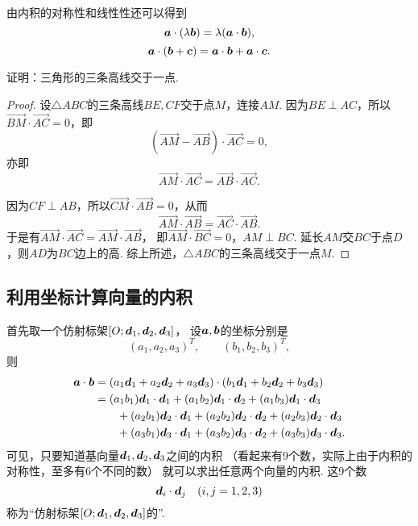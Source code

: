由内积的对称性和线性性还可以得到\[
	\boldsymbol{a}\cdot(\lambda\boldsymbol{b})=\lambda(\boldsymbol{a}\cdot\boldsymbol{b}),
\]\[
	\boldsymbol{a}\cdot(\boldsymbol{b}+\boldsymbol{c})=\boldsymbol{a}\cdot\boldsymbol{b}+\boldsymbol{a}\cdot\boldsymbol{c}.
\]

\begin{example}
证明：三角形的三条高线交于一点.
\begin{proof}
设\(\triangle ABC\)的三条高线\(BE,CF\)交于点\(M\)，连接\(AM\).
因为\(BE \perp AC\)，所以\(\vec{BM}\cdot\vec{AC}=0\)，即\[
	(\vec{AM}-\vec{AB})\cdot\vec{AC}=0,
\]
亦即\[
	\vec{AM}\cdot\vec{AC}=\vec{AB}\cdot\vec{AC}.
\]

因为\(CF \perp AB\)，所以\(\vec{CM}\cdot\vec{AB}=0\)，从而\[
	\vec{AM}\cdot\vec{AB}=\vec{AC}\cdot\vec{AB}.
\]
于是有\(\vec{AM}\cdot\vec{AC}=\vec{AM}\cdot\vec{AB}\)，
即\(\vec{AM}\cdot\vec{BC}=0\)，\(AM \perp BC\).
延长\(AM\)交\(BC\)于点\(D\)，则\(AD\)为\(BC\)边上的高.
综上所述，\(\triangle ABC\)的三条高线交于一点\(M\).
\end{proof}
\end{example}

\subsection{利用坐标计算向量的内积}
首先取一个仿射标架\([O;\boldsymbol{d}_1,\boldsymbol{d}_2,\boldsymbol{d}_3]\)，
设\(\boldsymbol{a},\boldsymbol{b}\)的坐标分别是\[
	(a_1,a_2,a_3)^T, \qquad
	(b_1,b_2,b_3)^T,
\]
则\begin{equation}
	\begin{split}
	\boldsymbol{a}\cdot\boldsymbol{b}
	&= (a_1 \boldsymbol{d}_1 + a_2 \boldsymbol{d}_2 + a_3 \boldsymbol{d}_3)
	\cdot (b_1 \boldsymbol{d}_1 + b_2 \boldsymbol{d}_2 + b_3 \boldsymbol{d}_3) \\
	&= (a_1 b_1) \boldsymbol{d}_1 \cdot \boldsymbol{d}_1
	+ (a_1 b_2) \boldsymbol{d}_1 \cdot \boldsymbol{d}_2
	+ (a_1 b_3) \boldsymbol{d}_1 \cdot \boldsymbol{d}_3 \\
	&\hspace{20pt}
	+ (a_2 b_1) \boldsymbol{d}_2 \cdot \boldsymbol{d}_1
	+ (a_2 b_2) \boldsymbol{d}_2 \cdot \boldsymbol{d}_2
	+ (a_2 b_3) \boldsymbol{d}_2 \cdot \boldsymbol{d}_3 \\
	&\hspace{20pt}
	+ (a_3 b_1) \boldsymbol{d}_3 \cdot \boldsymbol{d}_1
	+ (a_3 b_2) \boldsymbol{d}_3 \cdot \boldsymbol{d}_2
	+ (a_3 b_3) \boldsymbol{d}_3 \cdot \boldsymbol{d}_3.
	\end{split}
\end{equation}
可见，只要知道基向量\(\boldsymbol{d}_1,\boldsymbol{d}_2,\boldsymbol{d}_3\)之间的内积
（看起来有9个数，实际上由于内积的对称性，至多有6个不同的数）
就可以求出任意两个向量的内积.
这9个数\[
	\boldsymbol{d}_i \cdot \boldsymbol{d}_j
	\quad(i,j=1,2,3)
\]称为“仿射标架\([O;\boldsymbol{d}_1,\boldsymbol{d}_2,\boldsymbol{d}_3]\)的”.

